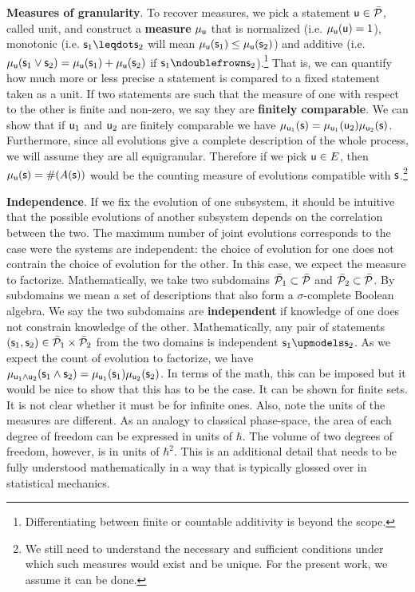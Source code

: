 \documentclass[10pt, onecolumn, longbibliography, nofootinbib]{revtex4-2}
\begin{document}
\textbf{Measures of granularity}. To recover measures, we pick a statement $\stmt[u] \in \tdomain[P]$, called unit, and construct a \textbf{measure} $\mu_{\stmt[u]}$ that is normalized (i.e. $\mu_{\stmt[u]}(\stmt[u]) = 1$), monotonic (i.e. $\stmt_1 \finer \stmt_2$ will mean $\mu_{\stmt[u]}(\stmt_1) \leq \mu_{\stmt[u]}(\stmt_2)$) and additive (i.e. $\mu_{\stmt[u]}(\stmt_1 \OR \stmt_2) = \mu_{\stmt[u]}(\stmt_1) + \mu_{\stmt[u]}(\stmt_2)$ if $\stmt_1 \ncomp \stmt_2$).\footnote{Differentiating between finite or countable additivity is beyond the scope.} That is, we can quantify how much more or less precise a statement is compared to a fixed statement taken as a unit. If two statements are such that the measure of one with respect to the other is finite and non-zero, we say they are \textbf{finitely comparable}. We can show that if $\stmt[u]_1$ and $\stmt[u]_2$ are finitely comparable we have $ \mu_{\stmt[u]_1}(\stmt) = \mu_{\stmt[u]_1}(\stmt[u]_2) \mu_{\stmt[u]_2}(\stmt)$. Furthermore, since all evolutions give a complete description of the whole process, we will assume they are all equigranular. Therefore if we pick $\stmt[u] \in E$, then $\mu_{\stmt[u]}(\stmt)=\#(A(\stmt))$ would be the counting measure of evolutions compatible with $\stmt$.\footnote{We still need to understand the necessary and sufficient conditions under which such measures would exist and be unique. For the present work, we assume it can be done.}

\textbf{Independence}. If we fix the evolution of one subsystem, it should be intuitive that the possible evolutions of another subsystem depends on the correlation between the two. The maximum number of joint evolutions corresponds to the case were the systems are independent: the choice of evolution for one does not contrain the choice of evolution for the other. In this case, we expect the measure to factorize. Mathematically, we take two subdomains $\tdomain[P]_1 \subset \tdomain[P]$ and $\tdomain[P]_2 \subset \tdomain[P]$. By subdomains we mean a set of descriptions that also form a $\sigma$-complete Boolean algebra. We say the two subdomains are \textbf{independent} if knowledge of one does not constrain knowledge of the other. Mathematically, any pair of statements $(\stmt_1, \stmt_2) \in \tdomain[P]_1 \times \tdomain[P]_2$ from the two domains is independent $\stmt_1 \indep \stmt_2$. As we expect the count of evolution to factorize, we have $ \mu_{\stmt[u]_1 \AND \stmt[u]_2}(\stmt_1 \AND \stmt_2) = \mu_{\stmt[u]_1}(\stmt_1) \mu_{\stmt[u]_2}(\stmt_2)$. In terms of the math, this can be imposed but it would be nice to show that this has to be the case. It can be shown for finite sets. It is not clear whether it must be for infinite ones. Also, note the units of the measures are different. As an analogy to classical phase-space, the area of each degree of freedom can be expressed in units of $\hbar$. The volume of two degrees of freedom, however, is in units of $\hbar^2$. This is an additional detail that needs to be fully understood mathematically in a way that is typically glossed over in statistical mechanics.
\end{document}
